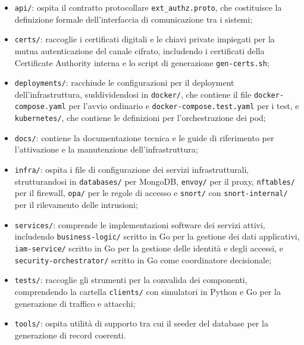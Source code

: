 \begin{itemize}
\item \texttt{api/}: ospita il contratto protocollare \texttt{ext\_authz.proto}, che costituisce la definizione formale dell'interfaccia di comunicazione tra i sistemi;

\item \texttt{certs/}: raccoglie i certificati digitali e le chiavi private impiegati per la mutua autenticazione del canale cifrato, includendo i certificati della Certificate Authority interna e lo script di generazione \texttt{gen-certs.sh};

\item \texttt{deployments/}: racchiude le configurazioni per il deployment dell'infrastruttura, suddividendosi in \texttt{docker/}, che contiene il file \texttt{docker-compose.yaml} per l'avvio ordinario e \texttt{docker-compose.test.yaml} per i test, e \texttt{kubernetes/}, che contiene le definizioni per l'orchestrazione dei pod;

\item \texttt{docs/}: contiene la documentazione tecnica e le guide di riferimento per l'attivazione e la manutenzione dell'infrastruttura;

\item \texttt{infra/}: ospita i file di configurazione dei servizi infrastrutturali, strutturandosi in \texttt{databases/} per MongoDB, \texttt{envoy/} per il proxy, \texttt{nftables/} per il firewall, \texttt{opa/} per le regole di accesso e \texttt{snort/} con \texttt{snort-internal/} per il rilevamento delle intrusioni;

\item \texttt{services/}: comprende le implementazioni software dei servizi attivi, includendo \texttt{business-logic/} scritto in Go per la gestione dei dati applicativi, \texttt{iam-service/} scritto in Go per la gestione delle identità e degli accessi, e \texttt{security-orchestrator/} scritto in Go come coordinatore decisionale;

\item \texttt{tests/}: raccoglie gli strumenti per la convalida dei componenti, comprendendo la cartella \texttt{clients/} con simulatori in Python e Go per la generazione di traffico e attacchi;

\item \texttt{tools/}: ospita utilità di supporto tra cui il seeder del database per la generazione di record coerenti.
\end{itemize}

